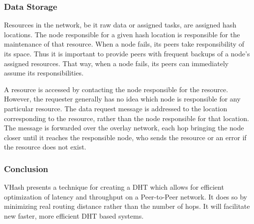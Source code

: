 \documentclass{article}
\begin{document}
\subsubsection*{Data Storage}
Resources in the network, be it raw data or assigned tasks, are assigned hash locations. The node responsible for a given hash location is responsible for the maintenance of that resource. When a node fails, its peers take responsibility of its space. Thus it is important to provide peers with frequent backups of a node's assigned resources.  That way, when a node fails, its peers can immediately assume its responsibilities.

A resource is accessed by contacting the node responsible for the resource.  However, the requester generally has no idea which node is responsible for any particular resource.  The data request message is addressed to the location corresponding to the resource, rather than the node responsible for that location.  The message is forwarded over the overlay network, each hop bringing the node closer until it reaches the responsible node, who sends the resource or an error if the resource does not exist.

\subsubsection*{Conclusion} 
VHash presents a technique for creating a DHT which allows for efficient optimization of latency and throughput on a Peer-to-Peer network. It does so by minimizing real routing distance rather than the number of hops. It will facilitate new faster, more efficient DHT based systems.
  
  


{\footnotesize


}
\end{document}
